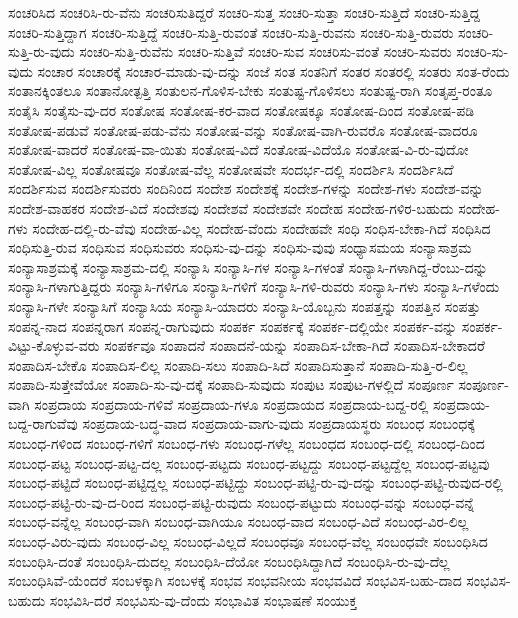 {ಸಂಚರಿಸಿದ
ಸಂಚರಿಸಿ-ರು-ವೆನು
ಸಂಚರಿಸುತಿದ್ದರೆ
ಸಂಚರಿ-ಸುತ್ತ
ಸಂಚರಿ-ಸುತ್ತಾ
ಸಂಚರಿ-ಸುತ್ತಿದೆ
ಸಂಚರಿ-ಸುತ್ತಿದ್ದ
ಸಂಚರಿ-ಸುತ್ತಿದ್ದಾಗ
ಸಂಚರಿ-ಸುತ್ತಿದ್ದೆ
ಸಂಚರಿ-ಸುತ್ತಿ-ರುವಂತೆ
ಸಂಚರಿ-ಸುತ್ತಿ-ರುವನು
ಸಂಚರಿ-ಸುತ್ತಿ-ರುವರು
ಸಂಚರಿ-ಸುತ್ತಿ-ರು-ವುದು
ಸಂಚರಿ-ಸುತ್ತಿ-ರುವೆನು
ಸಂಚರಿ-ಸುತ್ತಿವೆ
ಸಂಚರಿ-ಸುವ
ಸಂಚರಿಸು-ವಂತೆ
ಸಂಚರಿ-ಸುವರು
ಸಂಚರಿ-ಸು-ವುದು
ಸಂಚಾರ
ಸಂಚಾರಕ್ಕೆ
ಸಂಚಾರ-ಮಾಡು-ವು-ದನ್ನು
ಸಂಜೆ
ಸಂತ
ಸಂತನಿಗೆ
ಸಂತರ
ಸಂತರಲ್ಲಿ
ಸಂತರು
ಸಂತ-ರೆಂದು
ಸಂತಾನಕ್ಕಿಂತಲೂ
ಸಂತಾನೋತ್ಪತ್ತಿ
ಸಂತುಲನ-ಗೊಳಿಸ-ಬೇಕು
ಸಂತುಷ್ಟ-ಗೊಳಿಸಲು
ಸಂತುಷ್ಟ-ರಾಗಿ
ಸಂತೃಪ್ತ-ರಂತೂ
ಸಂತೈಸಿ
ಸಂತೈಸು-ವು-ದರ
ಸಂತೋಷ
ಸಂತೋಷ-ಕರ-ವಾದ
ಸಂತೋಷಕ್ಕೂ
ಸಂತೋಷ-ದಿಂದ
ಸಂತೋಷ-ಪಡಿ
ಸಂತೋಷ-ಪಡುವೆ
ಸಂತೋಷ-ಪಡು-ವೆನು
ಸಂತೋಷ-ವನ್ನು
ಸಂತೋಷ-ವಾಗಿ-ರುವರೊ
ಸಂತೋಷ-ವಾದರೂ
ಸಂತೋಷ-ವಾದರೆ
ಸಂತೋಷ-ವಾ-ಯಿತು
ಸಂತೋಷ-ವಿದೆ
ಸಂತೋಷ-ವಿದೆಯೊ
ಸಂತೋಷ-ವಿ-ರು-ವುದೋ
ಸಂತೋಷ-ವಿಲ್ಲ
ಸಂತೋಷವೂ
ಸಂತೋಷ-ವೆಲ್ಲ
ಸಂತೋಷವೇ
ಸಂದರ್ಭ-ದಲ್ಲಿ
ಸಂದರ್ಶಿಸಿ
ಸಂದರ್ಶಿಸಿದೆ
ಸಂದರ್ಶಿಸುವ
ಸಂದರ್ಶಿಸುವರು
ಸಂದಿನಿಂದ
ಸಂದೇಶ
ಸಂದೇಶಕ್ಕೆ
ಸಂದೇಶ-ಗಳನ್ನು
ಸಂದೇಶ-ಗಳು
ಸಂದೇಶ-ವನ್ನು
ಸಂದೇಶ-ವಾಹಕರ
ಸಂದೇಶ-ವಿದೆ
ಸಂದೇಶವು
ಸಂದೇಶವೆ
ಸಂದೇಶವೇ
ಸಂದೇಹ
ಸಂದೇಹ-ಗಳಿರ-ಬಹುದು
ಸಂದೇಹ-ಗಳು
ಸಂದೇಹ-ದಲ್ಲಿ-ರು-ವೆವು
ಸಂದೇಹ-ವಿಲ್ಲ
ಸಂದೇಹ-ವೆಂದು
ಸಂದೇಹವೇ
ಸಂಧಿ
ಸಂಧಿಸ-ಬೇಕಾ-ಗಿದೆ
ಸಂಧಿಸಿದ
ಸಂಧಿಸುತ್ತಿ-ರುವ
ಸಂಧಿಸುವ
ಸಂಧಿಸುವರು
ಸಂಧಿಸು-ವು-ದನ್ನು
ಸಂಧಿಸು-ವುವು
ಸಂಧ್ಯಾಸಮಯ
ಸಂನ್ಯಾಸಾಶ್ರಮ
ಸಂನ್ಯಾಸಾಶ್ರಮಕ್ಕೆ
ಸಂನ್ಯಾಸಾಶ್ರಮ-ದಲ್ಲಿ
ಸಂನ್ಯಾಸಿ
ಸಂನ್ಯಾಸಿ-ಗಳ
ಸಂನ್ಯಾಸಿ-ಗಳಂತೆ
ಸಂನ್ಯಾಸಿ-ಗಳಾಗಿದ್ದ-ರೆಂಬು-ದನ್ನು
ಸಂನ್ಯಾಸಿ-ಗಳಾಗುತ್ತಿದ್ದರು
ಸಂನ್ಯಾಸಿ-ಗಳಿಗೂ
ಸಂನ್ಯಾಸಿ-ಗಳಿಗೆ
ಸಂನ್ಯಾಸಿ-ಗಳಿ-ರುವರು
ಸಂನ್ಯಾಸಿ-ಗಳು
ಸಂನ್ಯಾಸಿ-ಗಳೆಂದು
ಸಂನ್ಯಾಸಿ-ಗಳೇ
ಸಂನ್ಯಾಸಿಗೆ
ಸಂನ್ಯಾಸಿಯ
ಸಂನ್ಯಾಸಿ-ಯಾದರು
ಸಂನ್ಯಾಸಿ-ಯೊಬ್ಬನು
ಸಂಪತ್ತನ್ನು
ಸಂಪತ್ತಿನ
ಸಂಪತ್ತು
ಸಂಪನ್ನ-ನಾದ
ಸಂಪನ್ನರಾಗ
ಸಂಪನ್ನ-ರಾಗುವುದು
ಸಂಪರ್ಕ
ಸಂಪರ್ಕಕ್ಕೆ
ಸಂಪರ್ಕ-ದಲ್ಲಿಯೇ
ಸಂಪರ್ಕ-ವನ್ನು
ಸಂಪರ್ಕ-ವಿಟ್ಟು-ಕೊಳ್ಳುವ-ವರು
ಸಂಪರ್ಕವೂ
ಸಂಪಾದನೆ
ಸಂಪಾದನೆ-ಯನ್ನು
ಸಂಪಾದಿಸ-ಬೇಕಾ-ಗಿದೆ
ಸಂಪಾದಿಸ-ಬೇಕಾದರೆ
ಸಂಪಾದಿಸ-ಬೇಕೊ
ಸಂಪಾದಿಸ-ಲಿಲ್ಲ
ಸಂಪಾದಿ-ಸಲು
ಸಂಪಾದಿ-ಸಿದೆ
ಸಂಪಾದಿಸುತ್ತಾನೆ
ಸಂಪಾದಿ-ಸುತ್ತಿ-ರ-ಲಿಲ್ಲ
ಸಂಪಾದಿ-ಸುತ್ತೇವೆಯೋ
ಸಂಪಾದಿ-ಸು-ವು-ದಕ್ಕೆ
ಸಂಪಾದಿ-ಸುವುದು
ಸಂಪುಟ
ಸಂಪುಟ-ಗಳಲ್ಲಿದೆ
ಸಂಪೂರ್ಣ
ಸಂಪೂರ್ಣ-ವಾಗಿ
ಸಂಪ್ರದಾಯ
ಸಂಪ್ರದಾಯ-ಗಳಿವೆ
ಸಂಪ್ರದಾಯ-ಗಳೂ
ಸಂಪ್ರದಾಯದ
ಸಂಪ್ರದಾಯ-ಬದ್ದ-ರಲ್ಲಿ
ಸಂಪ್ರದಾಯ-ಬದ್ದ-ರಾಗುವೆವು
ಸಂಪ್ರದಾಯ-ಬದ್ಧ-ವಾದ
ಸಂಪ್ರದಾಯ-ವಾಗು-ವುದು
ಸಂಪ್ರದಾಯಸ್ಥರು
ಸಂಬಂಧ
ಸಂಬಂಧಕ್ಕೆ
ಸಂಬಂಧ-ಗಳಿಂದ
ಸಂಬಂಧ-ಗಳಿಗೆ
ಸಂಬಂಧ-ಗಳು
ಸಂಬಂಧ-ಗಳೆಲ್ಲ
ಸಂಬಂಧದ
ಸಂಬಂಧ-ದಲ್ಲಿ
ಸಂಬಂಧ-ದಿಂದ
ಸಂಬಂಧ-ಪಟ್ಟ
ಸಂಬಂಧ-ಪಟ್ಟ-ದಲ್ಲ
ಸಂಬಂಧ-ಪಟ್ಟದು
ಸಂಬಂಧ-ಪಟ್ಟದ್ದು
ಸಂಬಂಧ-ಪಟ್ಟದ್ದೆಲ್ಲ
ಸಂಬಂಧ-ಪಟ್ಟವು
ಸಂಬಂಧ-ಪಟ್ಟಿದೆ
ಸಂಬಂಧ-ಪಟ್ಟಿದ್ದಲ್ಲ
ಸಂಬಂಧ-ಪಟ್ಟಿದ್ದು
ಸಂಬಂಧ-ಪಟ್ಟಿ-ರು-ವು-ದನ್ನು
ಸಂಬಂಧ-ಪಟ್ಟಿ-ರುವುದ-ರಲ್ಲಿ
ಸಂಬಂಧ-ಪಟ್ಟಿ-ರು-ವು-ದ-ರಿಂದ
ಸಂಬಂಧ-ಪಟ್ಟಿ-ರುವುದು
ಸಂಬಂಧ-ಪಟ್ಟುದು
ಸಂಬಂಧ-ವನ್ನು
ಸಂಬಂಧ-ವನ್ನೆ
ಸಂಬಂಧ-ವನ್ನೆಲ್ಲ
ಸಂಬಂಧ-ವಾಗಿ
ಸಂಬಂಧ-ವಾಗಿಯೂ
ಸಂಬಂಧ-ವಾದ
ಸಂಬಂಧ-ವಿದೆ
ಸಂಬಂಧ-ವಿರ-ಲಿಲ್ಲ
ಸಂಬಂಧ-ವಿರು-ವುದು
ಸಂಬಂಧ-ವಿಲ್ಲ
ಸಂಬಂಧ-ವಿಲ್ಲದೆ
ಸಂಬಂಧವೂ
ಸಂಬಂಧ-ವೆಲ್ಲ
ಸಂಬಂಧವೇ
ಸಂಬಂಧಿಸಿದ
ಸಂಬಂಧಿಸಿ-ದಂತೆ
ಸಂಬಂಧಿಸಿ-ದುದಲ್ಲ
ಸಂಬಂಧಿಸಿ-ದೆಯೋ
ಸಂಬಂಧಿಸಿದ್ದಾಗಿದೆ
ಸಂಬಂಧಿಸಿ-ರು-ವು-ದೆಲ್ಲ
ಸಂಬಂಧಿಸಿವೆ-ಯೆಂದರೆ
ಸಂಬಳಕ್ಕಾಗಿ
ಸಂಬಳಕ್ಕೆ
ಸಂಭವ
ಸಂಭವನೀಯ
ಸಂಭವವಿದೆ
ಸಂಭವಿಸ-ಬಹು-ದಾದ
ಸಂಭವಿಸ-ಬಹುದು
ಸಂಭವಿಸಿ-ದರೆ
ಸಂಭವಿಸು-ವು-ದೆಂದು
ಸಂಭಾವಿತ
ಸಂಭಾಷಣೆ
ಸಂಯುಕ್ತ
}
